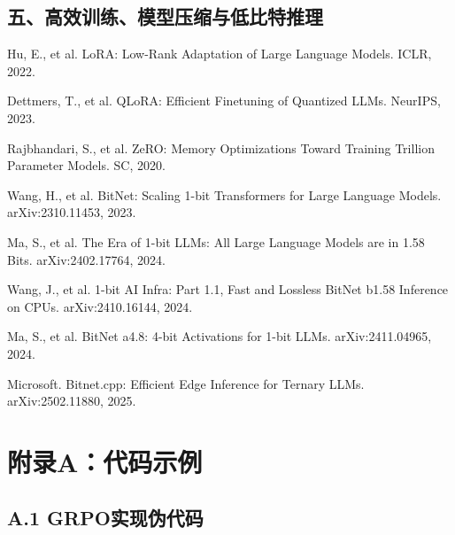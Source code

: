 \documentclass[12pt,a4paper]{article}
\begin{document}
\subsection*{五、高效训练、模型压缩与低比特推理}
\begin{enumerate}[label={[\arabic*]}, resume]
    \item Hu, E., et al. LoRA: Low-Rank Adaptation of Large Language Models. ICLR, 2022.

    \item Dettmers, T., et al. QLoRA: Efficient Finetuning of Quantized LLMs. NeurIPS, 2023.

    \item Rajbhandari, S., et al. ZeRO: Memory Optimizations Toward Training Trillion Parameter Models. SC, 2020.

    \item Wang, H., et al. BitNet: Scaling 1-bit Transformers for Large Language Models. arXiv:2310.11453, 2023.

    \item Ma, S., et al. The Era of 1-bit LLMs: All Large Language Models are in 1.58 Bits. arXiv:2402.17764, 2024.

    \item Wang, J., et al. 1-bit AI Infra: Part 1.1, Fast and Lossless BitNet b1.58 Inference on CPUs. arXiv:2410.16144, 2024.

    \item Ma, S., et al. BitNet a4.8: 4-bit Activations for 1-bit LLMs. arXiv:2411.04965, 2024.

    \item Microsoft. Bitnet.cpp: Efficient Edge Inference for Ternary LLMs. arXiv:2502.11880, 2025.
\end{enumerate}

\endgroup

\section*{附录A：代码示例}

\subsection*{A.1 GRPO实现伪代码}
\end{document}

